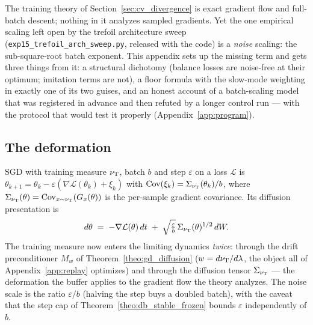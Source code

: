\section{\appendixFtitle}\label{app:sgd}

The training theory of Section~\ref{sec:cv_divergence} is exact gradient flow and
full-batch descent; nothing in it analyzes sampled gradients. Yet the one empirical
scaling left open by the trefoil architecture sweep
(\texttt{exp15\_trefoil\_arch\_sweep.py}, released with the code) is a \emph{noise}
scaling: the sub-square-root batch exponent. This appendix sets up the missing term and
gets three things from it: a structural dichotomy (balance losses are noise-free at
their optimum; imitation terms are not), a floor formula with the slow-mode weighting
in exactly one of its two guises, and an honest account of a batch-scaling model that
was registered in advance and then refuted by a longer control run --- with the
protocol that would test it properly (Appendix~\ref{app:program}).

\subsection{The deformation}\label{sec:deformation}

SGD with training measure $\nu_{\mathrm{T}}$, batch $b$ and step $\varepsilon$ on a loss
$\mathcal L$ is $\theta_{k+1} = \theta_k - \varepsilon(\nabla\mathcal L(\theta_k)+\xi_k)$
with $\mathrm{Cov}(\xi_k) = \Sigma_{\nu_{\mathrm{T}}}(\theta_k)/b$, where
$\Sigma_{\nu_{\mathrm{T}}}(\theta) = \mathrm{Cov}_{x\sim\nu_{\mathrm{T}}}(G_x(\theta))$ is the
per-sample gradient covariance. Its diffusion presentation \citep{li2019sme} is
\begin{equation}\label{equ:sme}
    d\theta \;=\; -\nabla\mathcal L(\theta)\,dt
    \;+\; \sqrt{\tfrac{\varepsilon}{b}}\,\Sigma_{\nu_{\mathrm{T}}}(\theta)^{1/2}\,dW .
\end{equation}
The training measure now enters the limiting dynamics \emph{twice}: through the drift
preconditioner $M_w$ of Theorem~\ref{theo:gd_diffusion} ($w = d\nu_{\mathrm{T}}/d\lambda$, the
object all of Appendix~\ref{app:replay} optimizes) and through the diffusion tensor
$\Sigma_{\nu_{\mathrm{T}}}$ --- the deformation the buffer applies to the gradient flow the
theory analyzes. The noise scale is the ratio $\varepsilon/b$ (halving the step buys a
doubled batch), with the caveat that the step cap of
Theorem~\ref{theo:db_stable_frozen} bounds $\varepsilon$ independently of $b$.

